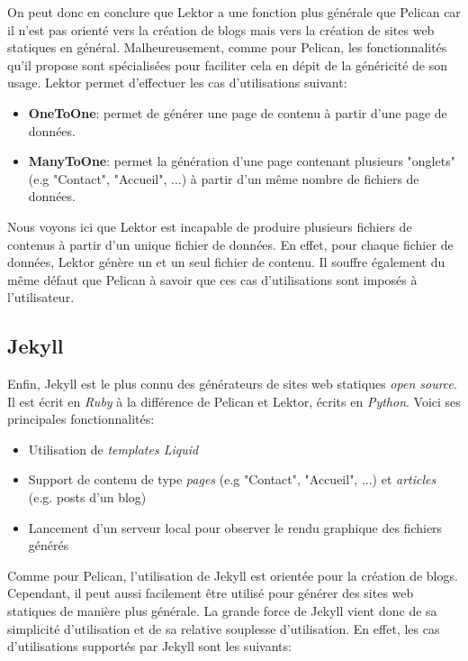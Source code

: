 	On peut donc en conclure que Lektor a une fonction plus générale que Pelican car il n'est pas orienté vers la création de blogs mais vers la création de sites web statiques en général. Malheureusement, comme pour Pelican, les fonctionnalités qu'il propose sont spécialisées pour faciliter cela en dépit  de la généricité de son usage. Lektor permet d'effectuer les cas d'utilisations suivant:\\
	
	\begin{itemize}
		\item \textbf{OneToOne}: permet de générer une page de contenu à partir d'une page de données.
		\item \textbf{ManyToOne}: permet la génération d'une page contenant plusieurs "onglets" (e.g "Contact", "Accueil", ...) à partir d'un même nombre de fichiers de données.
	\end{itemize}
	
	Nous voyons ici que Lektor est incapable de produire plusieurs fichiers de contenus à partir d'un unique fichier de données. En effet, pour chaque fichier de données, Lektor génère un et un seul fichier de contenu. Il souffre également du même défaut que Pelican à savoir que ces cas d'utilisations sont imposés à l'utilisateur. 
	
	\subsection*{Jekyll}
	Enfin, Jekyll \cite{Jekyll} est le plus connu des générateurs de sites web statiques \textit{open source}. Il est écrit en \textit{Ruby} à la différence de Pelican et Lektor, écrits en \textit{Python}. Voici ses principales fonctionnalités:
	
	\begin{itemize}
		\item Utilisation de \textit{templates Liquid}
		\item Support de contenu de type \textit{pages} (e.g "Contact", "Accueil", ...) et \textit{articles} (e.g. posts d'un blog)
		\item Lancement d'un serveur local pour observer le rendu graphique des fichiers générés\\
	\end{itemize}
	
	Comme pour Pelican, l'utilisation de Jekyll est orientée pour la création de blogs. Cependant, il peut aussi facilement être utilisé pour générer des sites web statiques de manière plus générale. La grande force de Jekyll vient donc de sa simplicité d'utilisation et de sa relative souplesse d'utilisation. En effet, les cas d'utilisations supportés par Jekyll sont les suivants:\\
	
